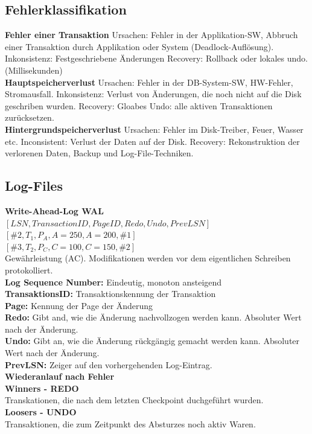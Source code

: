 \documentclass[7pt,landscape,a4paper]{scrartcl}
\begin{document}
\begin{multicols*}{4}
\subsection{Fehlerklassifikation}
\textbf{Fehler einer Transaktion} Ursachen: Fehler in der Applikation-SW, Abbruch einer Transaktion durch Applikation oder System (Deadlock-Auflösung). Inkonsistenz: Festgeschriebene Änderungen Recovery: Rollback oder lokales undo. (Millisekunden)\\
\textbf{Hauptspeicherverlust} Ursachen: Fehler in der DB-System-SW, HW-Fehler, Stromausfall. Inkonsistenz: Verlust von Änderungen, die noch nicht auf die Disk geschriben wurden. Recovery: Gloabes Undo: alle aktiven Transaktionen zurücksetzen.\\
\textbf{Hintergrundspeicherverlust} Ursachen: Fehler im Disk-Treiber, Feuer, Wasser etc. 
Inconsistent: Verlust der Daten auf der Disk. Recovery: Rekonstruktion der verlorenen Daten, Backup und Log-File-Techniken.
\subsection{Log-Files}
\textbf{Write-Ahead-Log WAL}\\
$[ LSN, TransactionID, PageID, Redo, Undo, PrevLSN]$\\
$[\#2, T_{1}, P_{A}, A=250, A=200, \#1]$\\
$[\#3, T_{2}, P_{C}, C=100, C=150, \#2]$\\
Gewährleistung (AC). Modifikationen werden vor dem eigentlichen Schreiben protokolliert.\\
\textbf{Log Sequence Number:} Eindeutig, monoton ansteigend\\
\textbf{TransaktionsID:} Transaktionskennung der Transaktion\\
\textbf{Page:} Kennung der Page der Änderung\\
\textbf{Redo:} Gibt and, wie die Änderung nachvollzogen werden kann. Absoluter Wert nach der Änderung.\\
\textbf{Undo:} Gibt an, wie die Änderung rückgängig gemacht werden kann. Absoluter Wert nach der Änderung.\\
\textbf{PrevLSN:} Zeiger auf den vorhergehenden Log-Eintrag.\\
\textbf{Wiederanlauf nach Fehler}\\
\textbf{Winners - REDO}\\
Transkationen, die nach dem letzten Checkpoint duchgeführt wurden.\\
\textbf{Loosers - UNDO}\\
Transaktionen, die zum Zeitpunkt des Absturzes noch aktiv Waren.

\end{multicols*}
\end{document}
